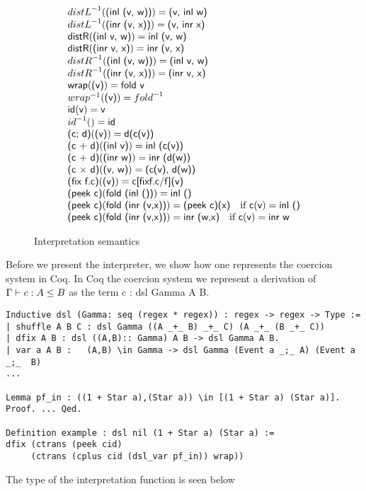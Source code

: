 \documentclass[a4paper,UKenglish,cleveref, autoref, thm-restate]{lipics-v2021}
\newcommand\mycomment[1]{}
\begin{document}
\begin{figure}
\begin{displaymath}
\begin{array}{l}
\iruleinv{distL}{(inl (v, w))}{(v, inl w)}\\
\iruleinv{distL}{(inr (v, x))}{(v, inr x)}\\
\irule{distR}{(inl v, w)}{inl (v, w)}\\
\irule{distR}{(inr v, x)}{inr (v, x)}\\
\iruleinv{distR}{(inl (v, w))}{(inl v, w)}\\
\iruleinv{distR}{(inr (v, x))}{(inr v, x)}\\
\irule{wrap}{(v)}{fold v}\\
\dslcominv{wrap}(\textsf{(v)})=\dslcominv{fold}\\
\irule{id}{v}{v}\\
\iruleinv{id}{}{id}\\
\irule{(c; d)}{(v)}{d(c(v))}\\
\irule{(c + d)}{(inl v)}{inl (c(v))}\\
\irule{(c + d)}{(inr w)}{inr (d(w))}\\
\irule{(c × d)}{(v, w)}{(c(v), d(w))}\\
\irule{(fix f.c)}{(v)}{c[fixf.c/f](v)}\\
\irule{(peek c)}{fold (inl ())}{inl ()}\\
\irule{(peek c)}{fold (inr (v,x))}{(peek c)(x)}\quad \text{if }\irule{c}{v}{inl ()}\\
\irule{(peek c)}{fold (inr (v,x))}{inr (w,x)}\quad \text{if }\irule{c}{v}{inr w}
    \end{array}
  \end{displaymath}
  \caption{Interpretation semantics}
\end{figure}
Before we present the interpreter, we show how one represents the coercion system in Coq.
In Coq the coercion system we represent a derivation of $\containsG{c}{A}{B}$ as the term  \textsf{c : dsl Gamma A B}.
\mycomment{change drop to peek in code}
\begin{verbatim}
Inductive dsl (Gamma: seq (regex * regex)) : regex -> regex -> Type := 
| shuffle A B C : dsl Gamma ((A _+_ B) _+_ C) (A _+_ (B _+_ C))
| dfix A B : dsl ((A,B):: Gamma) A B -> dsl Gamma A B.
| var a A B :   (A,B) \in Gamma -> dsl Gamma (Event a _;_ A) (Event a _;_  B) 
...

Lemma pf_in : ((1 + Star a),(Star a)) \in [(1 + Star a) (Star a)].
Proof. ... Qed.

Definition example : dsl nil (1 + Star a) (Star a) := 
dfix (ctrans (peek cid)
     (ctrans (cplus cid (dsl_var pf_in)) wrap))
\end{verbatim}
The type of the interpretation function is seen below
\end{document}

